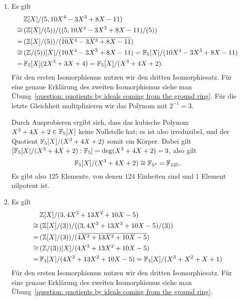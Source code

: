 \begin{solution}
  \begin{enumerate}
    \item
      Es gilt
      \begin{align*}
             &\,  \mathbb{Z}[X]/(5, 10 X^4 - 3 X^3 + 8 X - 11)
        \\
        \cong&\,  ( \mathbb{Z}[X]/(5) ) / ( (5, 10 X^4 - 3 X^3 + 8 X - 11)/(5) )
        \\
            =&\,  ( \mathbb{Z}[X]/(5) ) / ( \overline{10X^4 - 3 X^3 + 8 X - 11} )
        \\
        \cong&\,  (\mathbb{Z}/(5))[X] / (10 X^4 - 3 X^3 + 8 X - 11)
            =     \mathbb{F}_5[X]/(10 X^4 - 3 X^3 + 8 X - 11)
        \\
            =&\,  \mathbb{F}_5[X](2 X^3 + 3 X + 4)
            =     \mathbb{F}_5[X]/(X^3 + 4 X + 2).
      \end{align*}
      Für den ersten Isomorphismus nutzen wir den dritten Isomorphiesatz.
      Für eine genaue Erklärung des zweiten Isomorphismus siehe man Übung~\ref{question: quotients by ideals coming from the ground ring}.
      Für die letzte Gleichheit multiplizieren wir das Polynom mit $2^{-1} = 3$.
      
      Durch Ausprobieren ergibt sich, dass das kubische Polynom $X^3 + 4 X + 2 \in \mathbb{F}_5[X]$ keine Nullstelle hat; es ist also irreduzibel, und der Quotient $\mathbb{F}_5[X]/(X^3 + 4 X + 2)$ somit ein Körper.
      Dabei gilt $[\mathbb{F}_5[X]/(X^3 + 4 X + 2) : \mathbb{F}_5] = \deg (X^3 + 4 X + 2) = 3$, also gilt
      \[
              \mathbb{F}_5[X]/(X^3 + 4 X + 2)
        \cong \mathbb{F}_{5^3}
        =     \mathbb{F}_{125}.
      \]
      Es gibt also $125$ Elemente, von denen $124$ Einheiten sind und $1$ Element nilpotent ist.
      
    \item
      Es gilt
      \begin{align*}
             &\,  \mathbb{Z}[X]/(3, 4 X^3 + 13 X^2 + 10 X - 5)
        \\
        \cong&\,  (\mathbb{Z}[X] / (3)) / ( (3, 4 X^3 + 13 X^2 + 10 X - 5) / (3) )
        \\
            =&\,  (\mathbb{Z}[X] / (3)) / ( \overline{4 X^3 + 13 X^2 + 10 X - 5} )
        \\
        \cong&\,  (\mathbb{Z}/(3))[X] / (4 X^3 + 13 X^2 + 10 X - 5)
        \\
            =&\,  \mathbb{F}_3[X] / (4 X^3 + 13 X^2 + 10 X - 5)
            =     \mathbb{F}_3[X] / (X^3 + X^2 + X + 1)
      \end{align*}
      Für den ersten Isomorphismus nutzen wir den dritten Isomorphiesatz.
      Für eine genaue Erklärung des zweiten Isomorphismus siehe man Übung~\ref{question: quotients by ideals coming from the ground ring}.
      

\end{enumerate}
\end{solution}
